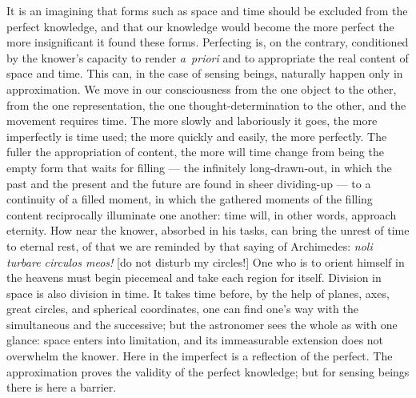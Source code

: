 \documentclass[12pt]{book}
\begin{document}
It is an imagining that forms such as space and time should be excluded from the
perfect knowledge, and that our knowledge would become the more perfect the more
insignificant it found these forms. Perfecting is, on the contrary, conditioned
by the knower's capacity to render \textit{a~priori} and to appropriate the real
content of space and time. This can, in the case of sensing beings, naturally
happen only in approximation. We move in our consciousness from the one object
to the other, from the one representation, the one thought-determination to the
other, and the movement requires time. The more slowly and laboriously it goes,
the more imperfectly is time used; the more quickly and easily, the more
perfectly. The fuller the appropriation of content, the more will time change
from being the empty form that waits for filling --- the infinitely
long-drawn-out, in which the past and the present and the future are found in
sheer dividing-up --- to a continuity of a filled moment, in which the gathered
moments of the filling content reciprocally illuminate one another: time will,
in other words, approach eternity. How near the knower, absorbed in his tasks,
can bring the unrest of time to eternal rest, of that we are reminded by that
saying of Archimedes: \textit{noli turbare circulos meos!} [do not disturb my
circles!] One who is to orient himself in the heavens must begin piecemeal and
take each region for itself. Division in space is also division in time. It
takes time before, by the help of planes, axes, great circles, and spherical
coordinates, one can find one's way with the simultaneous and the successive;
but the astronomer sees the whole as with one glance: space enters into
limitation, and its immeasurable extension does not overwhelm the knower. Here
in the imperfect is a reflection of the perfect. The approximation proves the
validity of the perfect knowledge; but for sensing beings there is here a
barrier.
\end{document}
